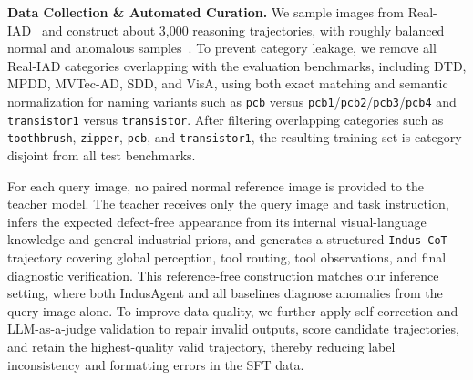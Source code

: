\documentclass{llmxive}
\begin{document}
\textbf{Data Collection \& Automated Curation.}
We sample images from Real-IAD~\citep{wang2024realiad} and construct about 3,000 reasoning trajectories, with roughly balanced normal and anomalous samples~\citep{wang2023selfinstruct}. 
To prevent category leakage, we remove all Real-IAD categories overlapping with the evaluation benchmarks, including DTD, MPDD, MVTec-AD, SDD, and VisA, using both exact matching and semantic normalization for naming variants such as \texttt{pcb} versus \texttt{pcb1}/\texttt{pcb2}/\texttt{pcb3}/\texttt{pcb4} and \texttt{transistor1} versus \texttt{transistor}. 
After filtering overlapping categories such as \texttt{toothbrush}, \texttt{zipper}, \texttt{pcb}, and \texttt{transistor1}, the resulting training set is category-disjoint from all test benchmarks.

For each query image, no paired normal reference image is provided to the teacher model. 
The teacher receives only the query image and task instruction, infers the expected defect-free appearance from its internal visual-language knowledge and general industrial priors, and generates a structured \texttt{Indus-CoT} trajectory covering global perception, tool routing, tool observations, and final diagnostic verification. 
This reference-free construction matches our inference setting, where both IndusAgent and all baselines diagnose anomalies from the query image alone. 
To improve data quality, we further apply self-correction and LLM-as-a-judge validation to repair invalid outputs, score candidate trajectories, and retain the highest-quality valid trajectory, thereby reducing label inconsistency and formatting errors in the SFT data.
\end{document}
